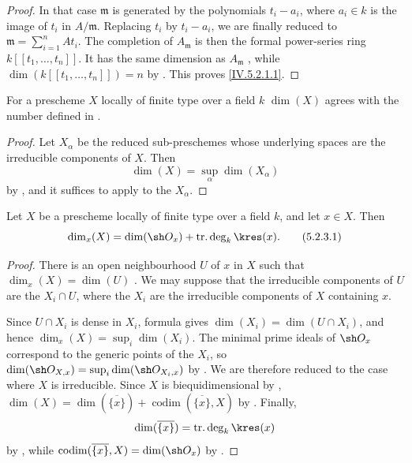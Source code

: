 \begin{proof}
In that case $\mathfrak m$ is generated by the polynomials
$t_i-a_i$, where $a_i\in k$ is the image of $t_i$ in
$A/\mathfrak m$.
Replacing $t_i$ by $t_i-a_i$, we are finally reduced to $\mathfrak m=\sum_{i=1}^n At_i$.
The completion of $A_{\mathfrak m}$ is then the formal power-series
ring $k[[t_1,\ldots,t_n]]$.
It has the same dimension as $A_{\mathfrak m}$
, while
$\dim(k[[t_1,\ldots,t_n]])=n$ by .
This proves \eqref{IV.5.2.1.1}.
\end{proof}

\begin{corollary}[5.2.2]
\label{IV.5.2.2}
For a prescheme $X$ locally of finite type over a field $k$
$\dim(X)$ agrees with the number defined in .
\end{corollary}

\begin{proof}
Let $X_\alpha$ be the reduced sub-preschemes whose underlying spaces
are the irreducible components of $X$.
Then
\[
\dim(X)=\sup_\alpha\dim(X_\alpha)
\]
by , and it suffices to apply
 to the $X_\alpha$.
\end{proof}

\begin{corollary}[5.2.3]
\label{IV.5.2.3}
Let $X$ be a prescheme locally of finite type over a field $k$, and
let $x\in X$. Then
\begin{equation}
\dim_x(X)=\dim(\sh O_x)+\operatorname{tr.deg}_k\kres(x).
\tag{5.2.3.1}\label{IV.5.2.3.1}
\end{equation}
\end{corollary}

\begin{proof}
There is an open neighbourhood $U$ of $x$ in $X$ such that
$\dim_x(X)=\dim(U)$ .
We may suppose that the irreducible components of $U$ are the
$X_i\cap U$, where the $X_i$ are the irreducible components of $X$
containing $x$.


Since $U\cap X_i$ is dense in $X_i$, formula 
gives $\dim(X_i)=\dim(U\cap X_i)$, and hence $\dim_x(X)=\sup_i\dim(X_i)$.
The minimal prime ideals of $\sh O_x$ correspond to the generic
points of the $X_i$, so $\dim(\sh O_{X,x})=\sup_i\dim(\sh O_{X_i,x})$
by .
We are therefore reduced to the case where $X$ is irreducible.
Since $X$ is biequidimensional by , $\dim(X)
=\dim(\overline{\{x\}})
+\operatorname{codim}(\overline{\{x\}},X)$
by .
Finally,
\[
\dim(\overline{\{x\}})
  =\operatorname{tr.deg}_k\kres(x)
\]
by , while $\operatorname{codim}(\overline{\{x\}},X)=\dim(\sh O_x)$
by .
\end{proof}

